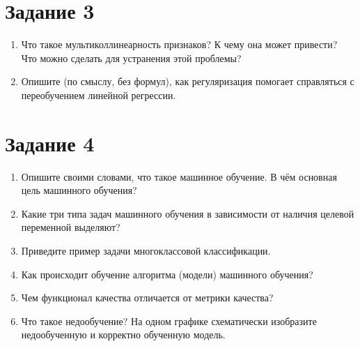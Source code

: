 \documentclass[11pt, a4paper]{extarticle}
\begin{document}
	\section*{Задание 3}
	\begin{enumerate}[label=\alph*)]
		\item Что такое мультиколлинеарность признаков? К чему она может привести? Что можно сделать для устранения этой проблемы? 
		\item Опишите (по смыслу, без формул), как регуляризация помогает справляться с переобучением линейной регрессии.
	\end{enumerate}

	\section*{Задание 4}
	\begin{enumerate}[label=\alph*)]
		\item Опишите своими словами, что такое машинное обучение. В чём основная цель машинного обучения?
		\item Какие три типа задач машинного обучения в зависимости от наличия целевой переменной выделяют? 
		\item Приведите пример задачи многоклассовой классификации. 
		\item Как происходит обучение алгоритма (модели) машинного обучения? 
		\item Чем функционал качества отличается от метрики качества?
		\item Что такое недообучение? На одном графике схематически изобразите недообученную и корректно обученную модель. 
	\end{enumerate}
	
\end{document}
